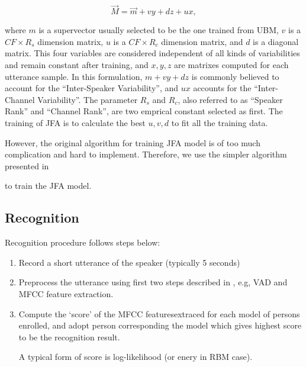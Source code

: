 \begin{enumerate}
          \[ \vec{M} = \vec{ m } + vy + dz + ux, \]

          where $m$ is a supervector usually selected to be the one trained from UBM, $v$ is a $ CF \times R_s$ dimension matrix,
          $ u$ is a $ CF \times R_c$ dimension matrix, and $d$ is a diagonal matrix.
          This four variables are considered independent of all kinds of variabilities and remain constant after training, and
          $x, y, z $ are matrixes computed for each utterance sample.
          In this formulation, $ m + vy + dz$ is commonly believed to account for the ``Inter-Speaker Variability'', and $ux $ accounts
          for the ``Inter-Channel Variability''.
          The parameter $ R_s $ and $ R_c$, also referred to as ``Speaker Rank'' and ``Channel Rank'', are two emprical constant selected as first.
          The training of JFA is to calculate the best $ u, v, d$ to fit all the training data.

          However, the original algorithm \cite{jfa-se} for training JFA model is of
          too much complication and hard to implement.
          Therefore, we use the simpler algorithm presented in \cite{jfa-study}

          to train the JFA model.
	\end{enumerate}

\subsection{Recognition}
	Recognition procedure follows steps below:
	\begin{enumerate}
		\item Record a short utterance of the speaker (typically 5 seconds)
		\item Preprocess the utterance using first two steps described in
			, e.g, VAD and MFCC feature extraction.
		\item Compute the `score' of the MFCC featuresextraced for each model of persons
			enrolled, and adopt person corresponding the model which gives highest score to be the
			recognition result.

			A typical form of score is log-likelihood (or enery in RBM case).

	\end{enumerate}

